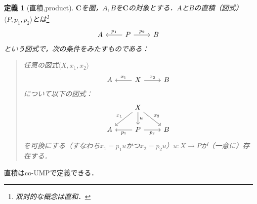 \documentclass[dvipdfmx,a4j,10pt]{jsarticle}
\theoremstyle{mystyle1}
\newtheorem{dfn}{定義}[section]
\theoremstyle{mystyle2}
\begin{document}
	\begin{dfn}[直積,product]
		$\mathbf{C}$を圏，$A,B$を$\mathbf{C}$の対象とする．$A$と$B$の直積（図式）$\langle P,p_1,p_2\rangle$とは\footnote{双対的な概念は直和．}
		\begin{equation}
			\begin{tikzcd}
				A & P \arrow[l,"p_1"'] \arrow[r,"p_2"] & B
			\end{tikzcd}
		\end{equation}
		という図式\footnotemark で，次の条件をみたすものである：
		\begin{quote}
			任意の図式$\langle X,x_1,x_2\rangle$
			\begin{equation}
				\begin{tikzcd}
					A & X \arrow[l,"x_1"'] \arrow[r,"x_2"] & B
				\end{tikzcd}
			\end{equation}
			について以下の図式：
			\begin{equation}
				\begin{tikzcd}
					& X \arrow[ld,"x_1"'] \arrow[d,"u"] \arrow[rd,"x_2"] & \\
					A & P \arrow[l,"p_1"] \arrow[r,"p_2"'] & B
				\end{tikzcd}
			\end{equation}
			を可換にする（すなわち$x_1=p_1u$かつ$x_2=p_2u$）$u:X\to P$が（一意に）存在する．
		\end{quote}
	\end{dfn}

	直積はco-UMPで定義できる．
\end{document}
